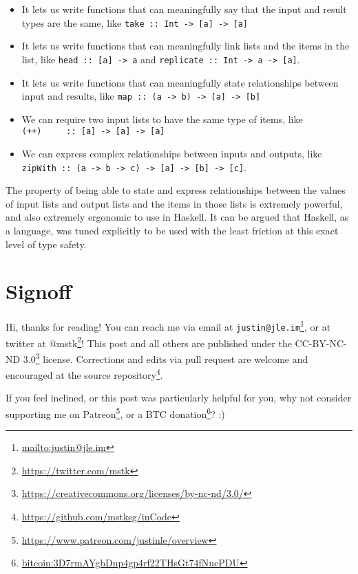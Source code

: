 \documentclass[]{article}
\renewcommand{\href}[2]{#2\footnote{\url{#1}}}
\begin{document}
\begin{itemize}
\tightlist
\item
  It lets us write functions that can meaningfully say that the input and result
  types are the same, like
  \texttt{take\ ::\ Int\ -\textgreater{}\ {[}a{]}\ -\textgreater{}\ {[}a{]}}
\item
  It lets us write functions that can meaningfully link lists and the items in
  the list, like \texttt{head\ ::\ {[}a{]}\ -\textgreater{}\ a} and
  \texttt{replicate\ ::\ Int\ -\textgreater{}\ a\ -\textgreater{}\ {[}a{]}}.
\item
  It lets us write functions that can meaningfully state relationships between
  input and results, like
  \texttt{map\ ::\ (a\ -\textgreater{}\ b)\ -\textgreater{}\ {[}a{]}\ -\textgreater{}\ {[}b{]}}
\item
  We can require two input lists to have the same type of items, like
  \texttt{(++)\ \ \ \ \ ::\ {[}a{]}\ -\textgreater{}\ {[}a{]}\ -\textgreater{}\ {[}a{]}}
\item
  We can express complex relationships between inputs and outputs, like
  \texttt{zipWith\ ::\ (a\ -\textgreater{}\ b\ -\textgreater{}\ c)\ -\textgreater{}\ {[}a{]}\ -\textgreater{}\ {[}b{]}\ -\textgreater{}\ {[}c{]}}.
\end{itemize}

The property of being able to state and express relationships between the values
of input lists and output lists and the items in those lists is extremely
powerful, and also extremely ergonomic to use in Haskell. It can be argued that
Haskell, as a language, was tuned explicitly to be used with the least friction
at this exact level of type safety.

\section{Signoff}\label{signoff}

Hi, thanks for reading! You can reach me via email at
\href{mailto:justin@jle.im}{\nolinkurl{justin@jle.im}}, or at twitter at
\href{https://twitter.com/mstk}{@mstk}! This post and all others are published
under the \href{https://creativecommons.org/licenses/by-nc-nd/3.0/}{CC-BY-NC-ND
3.0} license. Corrections and edits via pull request are welcome and encouraged
at \href{https://github.com/mstksg/inCode}{the source repository}.

If you feel inclined, or this post was particularly helpful for you, why not
consider \href{https://www.patreon.com/justinle/overview}{supporting me on
Patreon}, or a \href{bitcoin:3D7rmAYgbDnp4gp4rf22THsGt74fNucPDU}{BTC donation}?
:)
\end{document}
